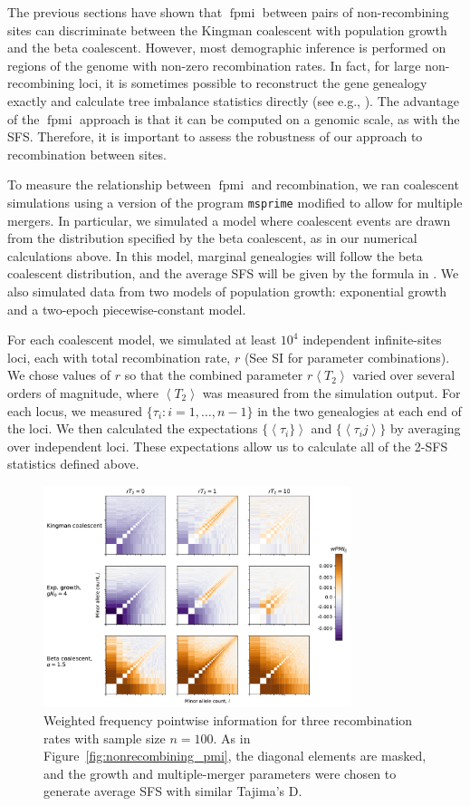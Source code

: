 \documentclass[11pt, letterpaper]{article}   	%
\newcommand{\Fig}[1]{Figure~\ref{#1}}
\newcommand{\E}[1]{\left< #1 \right>}
\DeclareMathOperator{\fpmi}{fpmi}
\begin{document}
The previous sections have shown that $\fpmi$ between pairs of non-recombining sites can discriminate between the Kingman coalescent with population growth and the beta coalescent.
However, most demographic inference is performed on regions of the genome with non-zero recombination rates.
In fact, for large non-recombining loci, it is sometimes possible to reconstruct the gene genealogy exactly and calculate tree imbalance statistics directly (see e.g., \cite{Seger2010}).
The advantage of the $\fpmi$ approach is that it can be computed on a genomic scale, as with the SFS.
Therefore, it is important to assess the robustness of our approach to recombination between sites.

To measure the relationship between $\fpmi$ and recombination, we ran coalescent simulations using a version of the program \texttt{msprime} \cite{KehellerEtAl201?} modified to allow for multiple mergers.
In particular, we simulated a model where coalescent events are drawn from the distribution specified by the beta coalescent, as in our numerical calculations above.
In this model, marginal genealogies will follow the beta coalescent distribution, and the average SFS will be given by the formula in \cite{BirknerEtAl2013}.
We also simulated data from two models of population growth: exponential growth and a two-epoch piecewise-constant model.

For each coalescent model, we simulated at least $10^4$ independent infinite-sites loci, each with total recombination rate, $r$ (See SI for parameter combinations).
We chose values of $r$ so that the combined parameter $r\E{T_2}$ varied over several orders of magnitude, where $\E{T_2}$ was measured from the simulation output.
For each locus, we measured $\{\tau_i : i = 1,\ldots,n-1\}$ in the two genealogies at each end of the loci.
We then calculated the expectations $\{\E{\tau_i\}}$ and $\{\E{\tau_ij}\}$ by averaging over independent loci.
These expectations allow us to calculate all of the 2-SFS statistics defined above.

\begin{figure}
\centering
\includegraphics[width=0.8\textwidth]{figures/figure4.pdf}
\caption{Weighted frequency pointwise information for three recombination rates with sample size $n=100$. As in \Fig{fig:nonrecombining_pmi}, the diagonal elements are masked, and the growth and multiple-merger parameters were chosen to generate average SFS with similar Tajima's D. \label{fig:wpmi_recombination}}
\end{figure}
\end{document}
